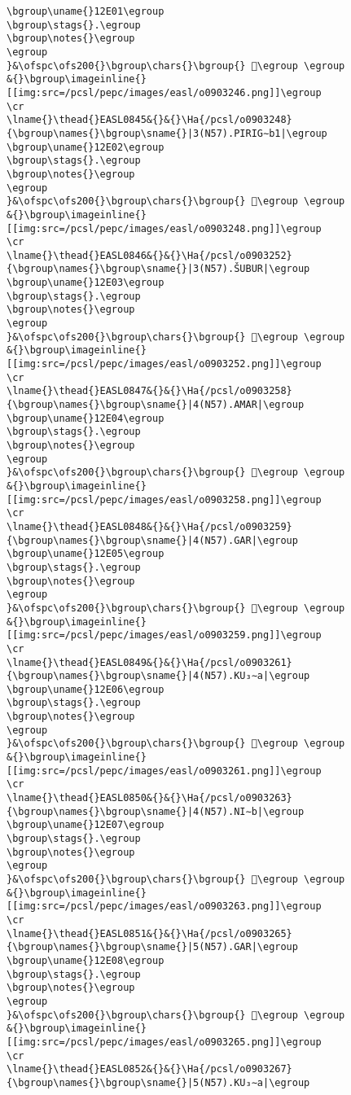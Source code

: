 \begin{verbatim}
\bgroup\uname{}12E01\egroup
\bgroup\stags{}.\egroup
\bgroup\notes{}\egroup
\egroup
}&\ofspc\ofs200{}\bgroup\chars{}\bgroup{} 𒸁\egroup \egroup
&{}\bgroup\imageinline{}[[img:src=/pcsl/pepc/images/easl/o0903246.png]]\egroup
\cr
\lname{}\thead{}EASL0845&{}&{}\Ha{/pcsl/o0903248}{\bgroup\names{}\bgroup\sname{}|3(N57).PIRIG∼b1|\egroup
\bgroup\uname{}12E02\egroup
\bgroup\stags{}.\egroup
\bgroup\notes{}\egroup
\egroup
}&\ofspc\ofs200{}\bgroup\chars{}\bgroup{} 𒸂\egroup \egroup
&{}\bgroup\imageinline{}[[img:src=/pcsl/pepc/images/easl/o0903248.png]]\egroup
\cr
\lname{}\thead{}EASL0846&{}&{}\Ha{/pcsl/o0903252}{\bgroup\names{}\bgroup\sname{}|3(N57).ŠUBUR|\egroup
\bgroup\uname{}12E03\egroup
\bgroup\stags{}.\egroup
\bgroup\notes{}\egroup
\egroup
}&\ofspc\ofs200{}\bgroup\chars{}\bgroup{} 𒸃\egroup \egroup
&{}\bgroup\imageinline{}[[img:src=/pcsl/pepc/images/easl/o0903252.png]]\egroup
\cr
\lname{}\thead{}EASL0847&{}&{}\Ha{/pcsl/o0903258}{\bgroup\names{}\bgroup\sname{}|4(N57).AMAR|\egroup
\bgroup\uname{}12E04\egroup
\bgroup\stags{}.\egroup
\bgroup\notes{}\egroup
\egroup
}&\ofspc\ofs200{}\bgroup\chars{}\bgroup{} 𒸄\egroup \egroup
&{}\bgroup\imageinline{}[[img:src=/pcsl/pepc/images/easl/o0903258.png]]\egroup
\cr
\lname{}\thead{}EASL0848&{}&{}\Ha{/pcsl/o0903259}{\bgroup\names{}\bgroup\sname{}|4(N57).GAR|\egroup
\bgroup\uname{}12E05\egroup
\bgroup\stags{}.\egroup
\bgroup\notes{}\egroup
\egroup
}&\ofspc\ofs200{}\bgroup\chars{}\bgroup{} 𒸅\egroup \egroup
&{}\bgroup\imageinline{}[[img:src=/pcsl/pepc/images/easl/o0903259.png]]\egroup
\cr
\lname{}\thead{}EASL0849&{}&{}\Ha{/pcsl/o0903261}{\bgroup\names{}\bgroup\sname{}|4(N57).KU₃∼a|\egroup
\bgroup\uname{}12E06\egroup
\bgroup\stags{}.\egroup
\bgroup\notes{}\egroup
\egroup
}&\ofspc\ofs200{}\bgroup\chars{}\bgroup{} 𒸆\egroup \egroup
&{}\bgroup\imageinline{}[[img:src=/pcsl/pepc/images/easl/o0903261.png]]\egroup
\cr
\lname{}\thead{}EASL0850&{}&{}\Ha{/pcsl/o0903263}{\bgroup\names{}\bgroup\sname{}|4(N57).NI∼b|\egroup
\bgroup\uname{}12E07\egroup
\bgroup\stags{}.\egroup
\bgroup\notes{}\egroup
\egroup
}&\ofspc\ofs200{}\bgroup\chars{}\bgroup{} 𒸇\egroup \egroup
&{}\bgroup\imageinline{}[[img:src=/pcsl/pepc/images/easl/o0903263.png]]\egroup
\cr
\lname{}\thead{}EASL0851&{}&{}\Ha{/pcsl/o0903265}{\bgroup\names{}\bgroup\sname{}|5(N57).GAR|\egroup
\bgroup\uname{}12E08\egroup
\bgroup\stags{}.\egroup
\bgroup\notes{}\egroup
\egroup
}&\ofspc\ofs200{}\bgroup\chars{}\bgroup{} 𒸈\egroup \egroup
&{}\bgroup\imageinline{}[[img:src=/pcsl/pepc/images/easl/o0903265.png]]\egroup
\cr
\lname{}\thead{}EASL0852&{}&{}\Ha{/pcsl/o0903267}{\bgroup\names{}\bgroup\sname{}|5(N57).KU₃∼a|\egroup

\end{verbatim}
